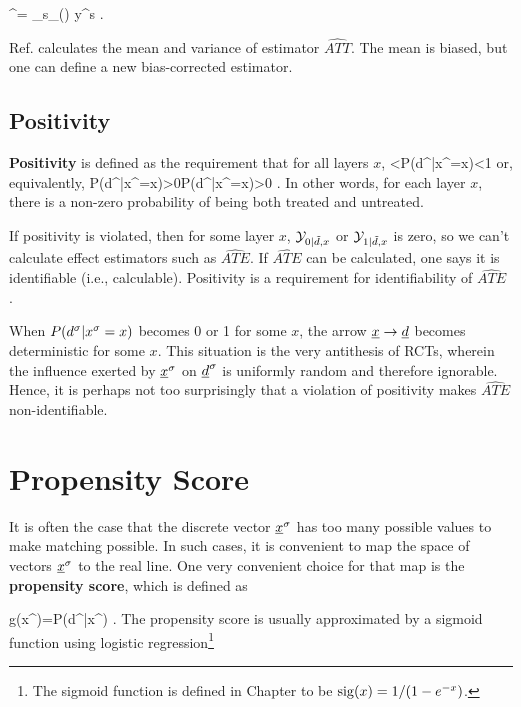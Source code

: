 \beq
{}^\s=
\sum_{s\in \calm_{\eps}(\s)}
y^s
\;.
\eeq

Ref.\cite{book-mixtape}
calculates the mean and variance
of estimator $\widehat{ATT}$. 
The mean is biased,
but one can define a new
bias-corrected estimator.


\subsection{Positivity}

{\bf Positivity} is defined as the
requirement that for all layers $x$,
<P(d^|x^\s=x)<1
\eeq
or, equivalently, 
\beq
P(d^|x^\s=x)>0P(d^|x^\s=x)>0
\;.
\eeq
In other words, 
for each layer $x$,
there is
a non-zero
probability of being both treated 
and untreated.

If positivity is violated,
then 
for some 
layer $x$, 
 ${\cal Y}_{0|{\tilde{d}},x}$ or ${\cal Y}_{1|{\tilde{d}},x}$ 
is zero,
so we can't calculate effect
estimators such as $\widehat{ATE}$.
If $\widehat{ATE}$ can be calculated,
one says it is identifiable (i.e.,
calculable). Positivity is a requirement
for identifiability
of $\widehat{ATE}$ .

 

When 
$P(d^\sigma|x^\sigma=x)$ 
becomes 0 or 1 for some $x$,
the arrow
${\underline{x}}\rightarrow{\underline{d}}$
becomes deterministic
for some $x$.
This situation
is
the very 
antithesis
of RCTs,
wherein 
the influence
exerted by ${\underline{x}}^\sigma$ on 
${\underline{d}}^\sigma$ is uniformly
random and therefore ignorable.
Hence, it is perhaps 
not too surprisingly
that a violation
of positivity makes
$\widehat{ATE}$
non-identifiable.



\section{Propensity Score}

It is often the case
that the discrete vector ${\underline{x}}^\sigma$
has
too many possible values to make
matching possible.
In such cases, it
is convenient to 
map the space
of vectors
${\underline{x}}^\sigma$
to the real line.
One very  
convenient choice
for that map
is the 
{\bf propensity score},
which is defined as

\beq
g(x^\s)=P(d^|x^\s)
\;.
\eeq
The
propensity
score
is usually
approximated
by a sigmoid
function
using logistic regression\footnote{
The sigmoid function is defined
in Chapter 
to be ${\rm sig} (x) = 1/(1-e^{-x})$.}


